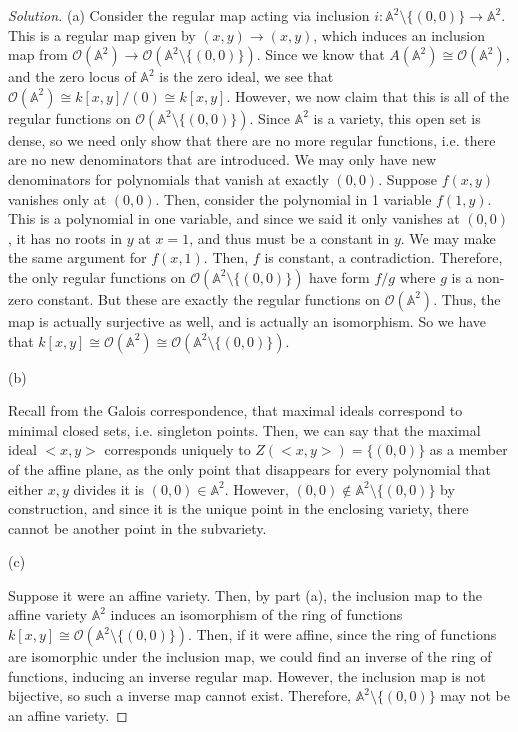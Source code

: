 \documentclass[10pt]{article}
\begin{document}
\begin{proof}[Solution]
 
(a)
Consider the regular map acting via inclusion $i: \mathbb{A}^2 \setminus \{ (0,0) \} \to \mathbb{A}^2$. This is a regular map given by $(x,y) \to (x,y)$, which induces an inclusion map from $\mathcal{O}(\mathbb{A}^2) \to \mathcal{O}(\mathbb{A}^2 \setminus \{ (0,0) \})$. Since we know that $A(\mathbb{A}^2) \cong  \mathcal{O}(\mathbb{A}^2)$, and the zero locus of $\mathbb{A}^2$ is the zero ideal, we see that $\mathcal{O}(\mathbb{A}^2) \cong k[x,y]/(0) \cong k[x,y]$. However, we now claim that this is all of the regular functions on $\mathcal{O}(\mathbb{A}^2 \setminus \{ (0,0) \})$. Since $\mathbb{A}^2$ is a variety, this open set is dense, so we need only show that there are no more regular functions, i.e. there are no new denominators that are introduced. We may only have new denominators for polynomials that vanish at exactly $(0,0)$. Suppose $f(x,y)$ vanishes only at $(0,0)$. Then, consider the polynomial in 1 variable $f(1,y)$. This is a polynomial in one variable, and since we said it only vanishes at $(0,0)$, it has no roots in $y$ at $x = 1$, and thus must be a constant in $y$. We may make the same argument for $f(x,1)$. Then, $f$ is constant, a contradiction. Therefore, the only regular functions on $ \mathcal{O}(\mathbb{A}^2 \setminus \{ (0,0) \})$ have form $f/g$ where $g$ is a non-zero constant. But these are exactly the regular functions on $\mathcal{O}(\mathbb{A}^2)$. Thus, the map is actually surjective as well, and is actually an isomorphism. So we have that $k[x,y] \cong \mathcal{O}(\mathbb{A}^2)  \cong  \mathcal{O}(\mathbb{A}^2 \setminus \{ (0,0) \})$.

(b)

Recall from the Galois correspondence, that maximal ideals correspond to minimal closed sets, i.e. singleton points. Then, we can say that the maximal ideal $<x,y>$ corresponds uniquely to $Z(<x,y>) = \{ (0,0) \}$ as a member of the affine plane, as the only point that disappears for every polynomial that either $x,y$ divides it is $(0,0) \in \mathbb{A}^2$. However, $(0,0) \not \in \mathbb{A}^2 \setminus \{ (0,0) \}$ by construction, and since it is the unique point in the enclosing variety, there cannot be another point in the subvariety.

(c)

Suppose it were an affine variety. Then, by part (a), the inclusion map to the affine variety $\mathbb{A}^2$ induces an isomorphism of the ring of functions $k[x,y] \cong \mathcal{O}(\mathbb{A}^2 \setminus \{ (0,0) \})$. Then, if it were affine, since the ring of functions are isomorphic under the inclusion map, we could find an inverse of the ring of functions, inducing an inverse regular map. However, the inclusion map is not bijective, so such a inverse map cannot exist. Therefore, $\mathbb{A}^2 \setminus \{ (0,0) \}$ may not be an affine variety.

\end{proof}
\end{document}
